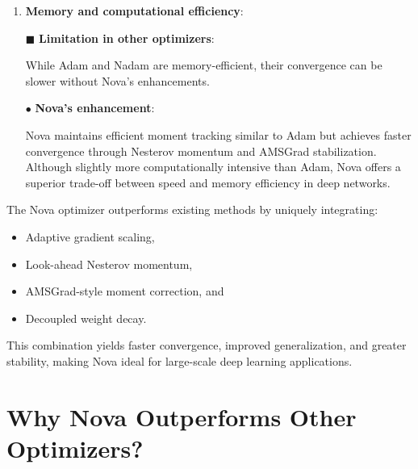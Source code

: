 \documentclass{article}
\begin{document}
\begin{enumerate}
Nova automates per-parameter learning rates using adaptive moment estimates:


\[
m_t = \beta_1 m_{t-1} + (1 - \beta_1) g_t,
\]




\[
v_t = \beta_2 v_{t-1} + (1 - \beta_2) g_t^2,
\]


with AMSGrad ensuring $\hat{v}_t$ does not decrease. This provides stable, automated learning rates without the need for extensive hyperparameter tuning \cite{Choi2019}.

\item{\bf Memory and computational efficiency}:

$\blacksquare$ \textbf{Limitation in other optimizers}:

While Adam and Nadam are memory-efficient, their convergence can be slower without Nova’s enhancements.

$\bullet$ \textbf{Nova’s enhancement}:

Nova maintains efficient moment tracking similar to Adam but achieves faster convergence through Nesterov momentum and AMSGrad stabilization. Although slightly more computationally intensive than Adam, Nova offers a superior trade-off between speed and memory efficiency in deep networks.


\end{enumerate}



The Nova optimizer outperforms existing methods by uniquely integrating:
\begin{itemize}
    \item Adaptive gradient scaling,
    \item Look-ahead Nesterov momentum,
    \item AMSGrad-style moment correction, and
    \item Decoupled weight decay.
\end{itemize}
This combination yields faster convergence, improved generalization, and greater stability, making Nova ideal for large-scale deep learning applications.












\section{Why Nova Outperforms Other Optimizers?}\label{Sec 7}
\end{document}
